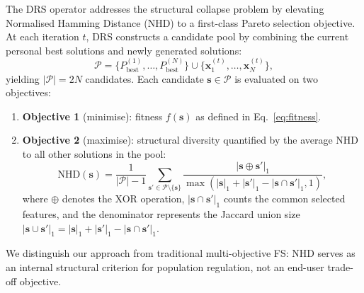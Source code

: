 \documentclass[a4paper,fleqn]{cas-dc}
\begin{document}
\begin{sloppypar}
	\par{
	The DRS operator addresses the structural collapse problem by
	elevating Normalised Hamming Distance (NHD) to a first-class Pareto
	selection objective.
	At each iteration $t$, DRS constructs a candidate pool by combining
	the current personal best solutions and newly generated solutions:
	\begin{equation}
		\mathcal{P} = \{P_{\mathrm{best}}^{(1)}, \ldots, P_{\mathrm{best}}^{(N)}\}
		\cup \{\mathbf{x}_1^{(t)}, \ldots, \mathbf{x}_N^{(t)}\},
		\label{eq:pool}
	\end{equation}
	yielding $|\mathcal{P}| = 2N$ candidates.
	Each candidate $\mathbf{s} \in \mathcal{P}$ is evaluated on two
	objectives:
	\begin{enumerate}
		\item \textbf{Objective 1} (minimise): fitness $f(\mathbf{s})$
		as defined in Eq.~\eqref{eq:fitness}.
		\item \textbf{Objective 2} (maximise): structural diversity
		quantified by the average NHD to all other solutions in the pool:
		\begin{equation}
			\mathrm{NHD}(\mathbf{s}) = \frac{1}{|\mathcal{P}|-1}
			\sum_{\mathbf{s}' \in \mathcal{P} \setminus \{\mathbf{s}\}}
			\frac{|\mathbf{s} \oplus \mathbf{s}'|_1}
			{\max(|\mathbf{s}|_1 + |\mathbf{s}'|_1 - |\mathbf{s} \cap \mathbf{s}'|_1, 1)},
			\label{eq:nhd}
		\end{equation}
		where $\oplus$ denotes the XOR operation,
		$|\mathbf{s} \cap \mathbf{s}'|_1$ counts the common selected features,
		and the denominator represents the Jaccard union size
		$|\mathbf{s} \cup \mathbf{s}'|_1 = |\mathbf{s}|_1 + |\mathbf{s}'|_1 - |\mathbf{s} \cap \mathbf{s}'|_1$.
	\end{enumerate}
	We distinguish our approach from traditional multi-objective FS:
	NHD serves as an internal structural criterion for population
	regulation, not an end-user trade-off objective.
	}


\end{sloppypar}
\end{document}
